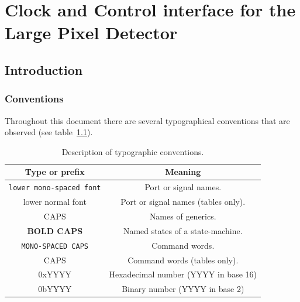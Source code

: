 \part{Clock and Control interface for the Large Pixel Detector} %
\label{prt:lpd_ccc_interface}

\chapter{Introduction} %
\label{cha:lpd_ccc_introduction}

\section{Conventions} %
\label{sec:conventions}
Throughout this document there are several typographical conventions that are observed (see table~\ref{tab:typography}).
% 
% 
\begin{table}[htbp]
  \begin{center}
  \begin{tabular}{c|c}
    Type or prefix                  & Meaning                             \\
    \hline                                                   
    \texttt{lower mono-spaced font} & Port or signal names.               \\
    lower normal font               & Port or signal names (tables only). \\
    CAPS                            & Names of generics.                  \\
    \textbf{BOLD CAPS}              & Named states of a state-machine.    \\
    \texttt{MONO-SPACED CAPS}       & Command words.                      \\
    CAPS                            & Command words (tables only).        \\
    0xYYYY                          & Hexadecimal number (YYYY in base 16)\\
    0bYYYY                          & Binary number (YYYY in base 2)      \\
  \end{tabular}
  \end{center}
  \caption{Description of typographic conventions.}
  \label{tab:typography}
\end{table}


